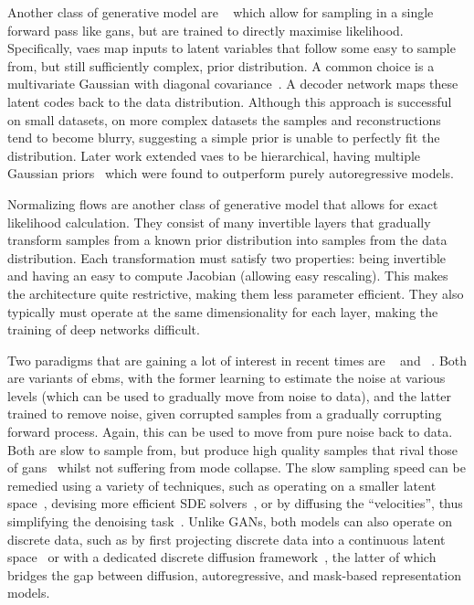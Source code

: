 Another class of generative model are ~\cite{kingma2013vae} which
allow for sampling in a single forward pass like \glspl{gan}, but are trained to
directly maximise likelihood. Specifically, \glspl{vae} map inputs to latent
variables that follow some easy to sample from, but still sufficiently complex,
prior distribution. A common choice is a multivariate Gaussian with diagonal
covariance~\cite{kingma2013vae}. A decoder network maps these latent codes back
to the data distribution. Although this approach is successful on small
datasets, on more complex datasets the samples and reconstructions tend to
become blurry, suggesting a simple prior is unable to perfectly fit the
distribution. Later work extended \glspl{vae} to be hierarchical, having
multiple Gaussian priors~\cite{arash2020nvae,child2020vqvae} which were found to
outperform purely autoregressive models.

Normalizing flows are another class of generative model that allows for exact
likelihood calculation. They consist of many invertible layers that gradually
transform samples from a known prior distribution into samples from the data
distribution. Each transformation must satisfy two properties: being invertible
and having an easy to compute Jacobian (allowing easy rescaling). This makes the
architecture quite restrictive, making them less parameter efficient. They also
typically must operate at the same dimensionality for each layer, making the
training of deep networks difficult.

Two paradigms that are gaining a lot of interest in recent times are
~\cite{ho2020ddpm} and ~\cite{song2019sbm}. Both
are variants of \glspl{ebm}, with the former learning to estimate the noise at
various levels (which can be used to gradually move from noise to data), and the
latter trained to remove noise, given corrupted samples from a gradually
corrupting forward process. Again, this can be used to move from pure noise back
to data. Both are slow to sample from, but produce high quality samples that
rival those of \glspl{gan}~\cite{dhariwal2021ddpm} whilst not suffering from
mode collapse. The slow sampling speed can be remedied using a variety of
techniques, such as operating on a smaller latent
space~\cite{vahdat2021sbmlatent}, devising more
efficient SDE solvers~\cite{martineau2021fast}, or by diffusing the
``velocities'', thus simplifying the denoising task~\cite{dockhorn2021langevin}.
Unlike GANs, both models can also operate on discrete data, such as by first
projecting discrete data into a continuous latent
space~\cite{vahdat2021sbmlatent} or with a dedicated discrete diffusion
framework~\cite{austin2021structured}, the latter of which bridges the gap
between diffusion, autoregressive, and mask-based representation models.

